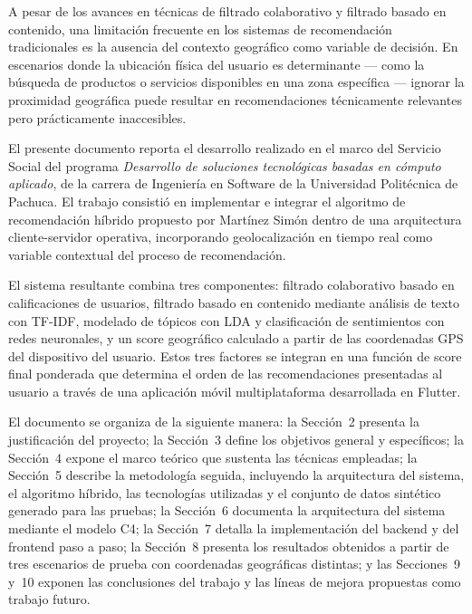 \documentclass[11pt, letterpaper]{article}
\begin{document}
	A pesar de los avances en técnicas de filtrado colaborativo y filtrado
	basado en contenido, una limitación frecuente en los sistemas de
	recomendación tradicionales es la ausencia del contexto geográfico como
	variable de decisión. En escenarios donde la ubicación física del usuario
	es determinante — como la búsqueda de productos o servicios disponibles
	en una zona específica — ignorar la proximidad geográfica puede resultar
	en recomendaciones técnicamente relevantes pero prácticamente inaccesibles.
	
	El presente documento reporta el desarrollo realizado en el marco del
	Servicio Social del programa \textit{Desarrollo de soluciones tecnológicas
		basadas en cómputo aplicado}, de la carrera de Ingeniería en Software de
	la Universidad Politécnica de Pachuca. El trabajo consistió en implementar
	e integrar el algoritmo de recomendación híbrido propuesto por Martínez
	Simón dentro de una arquitectura cliente-servidor operativa, incorporando
	geolocalización en tiempo real como variable contextual del proceso de
	recomendación.
	
	El sistema resultante combina tres componentes: filtrado colaborativo
	basado en calificaciones de usuarios, filtrado basado en contenido mediante
	análisis de texto con TF-IDF, modelado de tópicos con LDA y clasificación
	de sentimientos con redes neuronales, y un score geográfico calculado a
	partir de las coordenadas GPS del dispositivo del usuario. Estos tres
	factores se integran en una función de score final ponderada que determina
	el orden de las recomendaciones presentadas al usuario a través de una
	aplicación móvil multiplataforma desarrollada en Flutter.
	
	El documento se organiza de la siguiente manera: la Sección~2 presenta
	la justificación del proyecto; la Sección~3 define los objetivos general
	y específicos; la Sección~4 expone el marco teórico que sustenta las
	técnicas empleadas; la Sección~5 describe la metodología seguida,
	incluyendo la arquitectura del sistema, el algoritmo híbrido, las
	tecnologías utilizadas y el conjunto de datos sintético generado para
	las pruebas; la Sección~6 documenta la arquitectura del sistema mediante
	el modelo C4; la Sección~7 detalla la implementación del backend y del
	frontend paso a paso; la Sección~8 presenta los resultados obtenidos
	a partir de tres escenarios de prueba con coordenadas geográficas
	distintas; y las Secciones~9 y~10 exponen las conclusiones del trabajo
	y las líneas de mejora propuestas como trabajo futuro.
	
\end{document}
